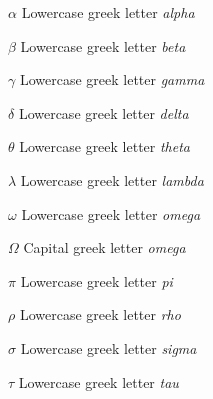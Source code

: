 \begin{simbolos}
  \item[$\alpha$] Lowercase greek letter \textit{alpha}
  \item[$\beta$] Lowercase greek letter \textit{beta}
  \item[$\gamma$] Lowercase greek letter \textit{gamma}
  \item[$\delta$] Lowercase greek letter \textit{delta}
  \item[$\theta$] Lowercase greek letter \textit{theta}
  \item[$\lambda$] Lowercase greek letter \textit{lambda}
  \item[$\omega$] Lowercase greek letter \textit{omega}
  \item[$\Omega$] Capital greek letter \textit{omega}
  \item[$\pi$] Lowercase greek letter \textit{pi}
  \item[$\rho$] Lowercase greek letter \textit{rho}
  \item[$\sigma$] Lowercase greek letter \textit{sigma}
  \item[$\tau$] Lowercase greek letter \textit{tau}
\end{simbolos}
\cleardoublepage
